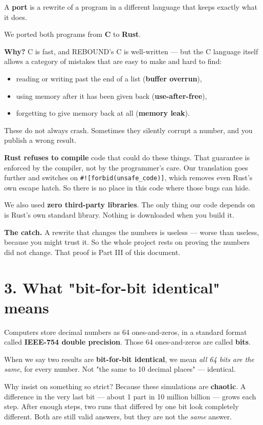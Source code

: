\documentclass[11pt]{article}
\begin{document}
A \textbf{port} is a rewrite of a program in a different language that keeps exactly what it does.

We ported both programs from \textbf{C} to \textbf{Rust}.

\textbf{Why?} C is fast, and REBOUND's C is well-written --- but the C language itself allows a category of mistakes that are easy to make and hard to find:

\begin{itemize}
\item reading or writing past the end of a list (\textbf{buffer overrun}),
\item using memory after it has been given back (\textbf{use-after-free}),
\item forgetting to give memory back at all (\textbf{memory leak}).
\end{itemize}

These do not always crash. Sometimes they silently corrupt a number, and you publish a wrong result.

\textbf{Rust refuses to compile} code that could do these things. That guarantee is enforced by the compiler, not by the programmer's care. Our translation goes further and switches on \texttt{\#![forbid(unsafe\_code)]}, which removes even Rust's own escape hatch. So there is no place in this code where those bugs can hide.

We also used \textbf{zero third-party libraries}. The only thing our code depends on is Rust's own standard library. Nothing is downloaded when you build it.

\textbf{The catch.} A rewrite that changes the numbers is useless --- worse than useless, because you might trust it. So the whole project rests on proving the numbers did not change. That proof is Part III of this document.

\section{3. What "bit-for-bit identical" means}

Computers store decimal numbers as 64 ones-and-zeros, in a standard format called \textbf{IEEE-754 double precision}. Those 64 ones-and-zeros are called \textbf{bits}.

When we say two results are \textbf{bit-for-bit identical}, we mean \emph{all 64 bits are the same}, for every number. Not "the same to 10 decimal places" --- identical.

Why insist on something so strict? Because these simulations are \textbf{chaotic}. A difference in the very last bit --- about 1 part in 10 million billion --- grows each step. After enough steps, two runs that differed by one bit look completely different. Both are still valid answers, but they are not the \emph{same} answer.
\end{document}
